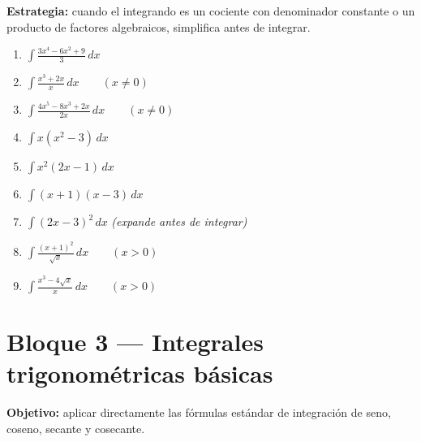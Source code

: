 \documentclass[12pt, letterpaper]{article}
\newcommand{\dx}{\,dx}
\begin{document}
\begin{cuadroadvertencia}
\small\textbf{Estrategia:} cuando el integrando es un cociente con denominador
constante o un producto de factores algebraicos, simplifica antes de integrar.
\end{cuadroadvertencia}

\begin{enumerate}[label=\textbf{\arabic*.}, leftmargin=*, itemsep=12pt, start=24]

  \item \medio\quad
    $\displaystyle\int \frac{3x^4 - 6x^2 + 9}{3}\dx$

  \item \medio\quad
    $\displaystyle\int \frac{x^3 + 2x}{x}\dx \qquad (x \neq 0)$

  \item \medio\quad
    $\displaystyle\int \frac{4x^5 - 8x^3 + 2x}{2x}\dx \qquad (x \neq 0)$

  \item \medio\quad
    $\displaystyle\int x(x^2 - 3)\dx$

  \item \medio\quad
    $\displaystyle\int x^2(2x - 1)\dx$

  \item \dificil\quad
    $\displaystyle\int (x+1)(x-3)\dx$

  \item \dificil\quad
    $\displaystyle\int (2x-3)^2\dx$\quad
    \textit{(expande antes de integrar)}

  \item \dificil\quad
    $\displaystyle\int \frac{(x+1)^2}{\sqrt{x}}\dx \qquad (x>0)$

  \item \dificil\quad
    $\displaystyle\int \frac{x^3 - 4\sqrt{x}}{x}\dx \qquad (x>0)$

\end{enumerate}

\vspace{4pt}

\section{Bloque 3 — Integrales trigonométricas básicas}

\begin{cuadroinfo}
\small\textbf{Objetivo:} aplicar directamente las fórmulas estándar de integración
de seno, coseno, secante y cosecante.
\end{cuadroinfo}
\end{document}
